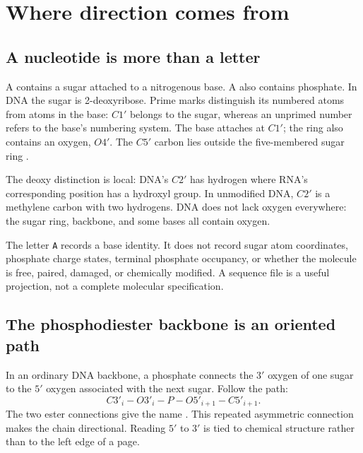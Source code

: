 \section{Where direction comes from}

\subsection{A nucleotide is more than a letter}

A  contains a sugar attached to a nitrogenous base.
A  also contains phosphate. In DNA the sugar is
2-deoxyribose. Prime marks distinguish its numbered atoms from atoms in the
base: $C1'$ belongs to the sugar, whereas an unprimed number refers to the
base's numbering system. The base attaches at $C1'$; the ring also contains
an oxygen, $O4'$. The $C5'$ carbon lies outside the five-membered sugar ring
\cite{IUPAC1983,IUPAC1970}.


The deoxy distinction is local: DNA's $C2'$ has hydrogen where RNA's
corresponding position has a hydroxyl group. In unmodified DNA, $C2'$ is a
methylene carbon with two hydrogens. DNA does not lack oxygen everywhere:
the sugar ring, backbone, and some bases all contain oxygen.

The letter \texttt{A} records a base identity. It does not record sugar atom
coordinates, phosphate charge states, terminal phosphate occupancy, or
whether the molecule is free, paired, damaged, or chemically modified.
A sequence file is a useful projection, not a complete molecular specification.

\subsection{The phosphodiester backbone is an oriented path}

In an ordinary DNA backbone, a phosphate connects the $3'$ oxygen of one
sugar to the $5'$ oxygen associated with the next sugar. Follow the path:
\begin{equation}
C3'_i-O3'_i-P-O5'_{i+1}-C5'_{i+1}.
\label{eq:backbone}
\end{equation}
The two ester connections give the name . This repeated
asymmetric connection makes the chain directional. Reading $5'$ to $3'$
is tied to chemical structure rather than to the left edge of a page.

